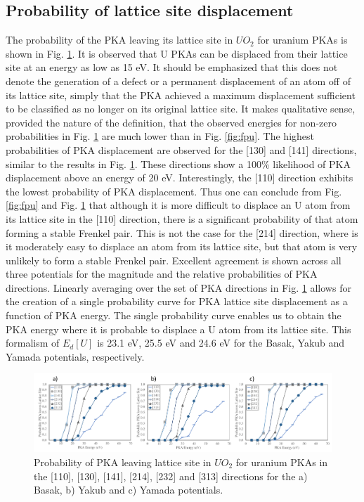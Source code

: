 \documentclass[8pt]{article}   	%
\begin{document}
\subsection{Probability of lattice site displacement}
\hspace{5mm}
The probability of the PKA leaving its lattice site in $UO_2$ for uranium PKAs is shown in Fig. \ref{fig:latu}. It is observed that U PKAs can be displaced from their lattice site at an energy as low as 15 eV. It should be emphasized that this does not denote the generation of a defect or a permanent displacement of an atom off of its lattice site, simply that the PKA achieved a maximum displacement sufficient to be classified as no longer on its original lattice site. It makes qualitative sense, provided the nature of the definition, that the observed energies for non-zero probabilities in Fig. \ref{fig:latu} are much lower than in Fig. \ref{fig:fpu}. The highest probabilities of PKA displacement are observed for the [130] and [141] directions, similar to the results in Fig. \ref{fig:latu}. These directions show a 100{\%} likelihood of PKA displacement above an energy of 20 eV. Interestingly, the [110] direction exhibits the lowest probability of PKA displacement. Thus one can conclude from Fig. \ref{fig:fpu} and Fig. \ref{fig:latu} that although it is more difficult to displace an U atom from its lattice site in the [110] direction, there is a significant probability of that atom forming a stable Frenkel pair. This is not the case for the [214] direction, where is it moderately easy to displace an atom from its lattice site, but that atom is very unlikely to form a stable Frenkel pair. Excellent agreement is shown across all three potentials for the magnitude and the relative probabilities of PKA directions. Linearly averaging over the set of PKA directions in Fig. \ref{fig:latu} allows for the creation of a single probability curve for PKA lattice site displacement as a function of PKA energy. The single probability curve enables us to obtain the PKA energy where it is probable to displace a U atom from its lattice site. This formalism of $E_d [U]$ is 23.1 eV, 25.5 eV and 24.6 eV for the Basak, Yakub and Yamada potentials, respectively.

\begin{figure}[h]
 \centering
 \includegraphics[width=1.0\textwidth]{lat_U.png}
 \caption{Probability of PKA leaving lattice site in $UO_2$ for uranium PKAs in the [110], [130], [141], [214], [232] and [313] directions for the a) Basak, b) Yakub and c) Yamada potentials.  }
 \label{fig:latu}
\end{figure}
\end{document}
